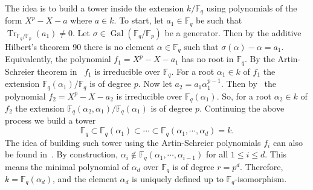 \documentclass[12pt]{article}
\theoremstyle{plain}
\theoremstyle{definition}
\DeclareMathOperator{\trace}{Tr} %
\DeclareMathOperator{\gal}{Gal} %
\def\F{\ensuremath{\mathbb{F}}}
\begin{document}
The idea is to build a 
tower inside the extension $k/\F_q$ using polynomials of the form $X^p - X - a$ where $a \in k$. To 
start, let $a_1 \in \F_q$ be such that $\trace_{\F_q/\F_p}(a_1) \ne 0$. Let $\sigma \in 
\gal(\F_q/\F_p)$ be a generator. Then by the additive Hilbert's theorem 90 there is no element 
$\alpha \in \F_q$ such that $\sigma(\alpha) - \alpha = a_1$. Equivalently, the polynomial $f_1 = 
X^p - X - a_1$ has no root in $\F_q$. By the Artin-Schreier theorem in~\cite[Ch VI]{lang} $f_1$ 
is irreducible over $\F_q$. For a root $\alpha_1 \in k$ of $f_1$ the extension $\F_q(\alpha_1) / 
\F_q$ is of degree $p$.
Now let $a_2 = a_1\alpha_1^{p - 1}$. Then by~\cite[Lemma 5]{Adleman-Lenstra} the polynomial $f_2 = 
X^p - X - a_2$ is irreducible over $\F_q(\alpha_1)$. So, for a root $\alpha_2 \in k$ of $f_2$ the 
extension $\F_q(\alpha_2, \alpha_1) / \F_q(\alpha_1)$ is of degree $p$. Continuing the above 
process we build a tower
\begin{equation}
	\label{equ:art-sch-tower}
	\F_q \subset \F_q(\alpha_1)  \subset \cdots \subset \F_q(\alpha_1, \cdots, \alpha_d) = k.
\end{equation}
The idea of building such tower using the Artin-Schreier polynomials $f_i$ can also be found
in~\cite{LenstraJr91, Allombert02, shoup93}. By construction, $\alpha_i \notin \F_q(\alpha_1, \cdots, 
\alpha_{i - 1})$ for all $1 \le i \le d$. This means the minimal polynomial of $\alpha_d$ over 
$\F_q$ is of degree $r = p^d$. Therefore, $k = \F_q(\alpha_d)$, and the element $\alpha_d$ is 
uniquely defined up to $\F_q$-isomorphism.
\end{document}

